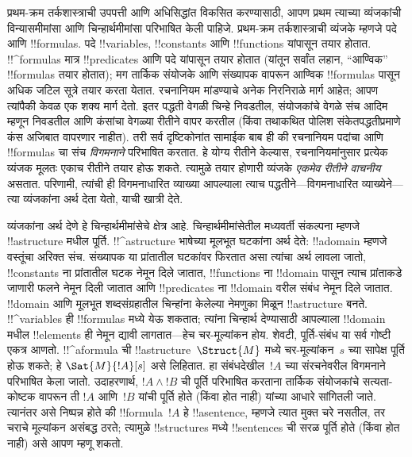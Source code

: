 \documentclass[../../../include/open-logic-section]{subfiles}
\begin{document}


प्रथम-क्रम तर्कशास्त्राची उपपत्ती आणि अधिसिद्धांत विकसित करण्यासाठी,
आपण प्रथम त्याच्या व्यंजकांची विन्यासमीमांसा आणि चिन्हार्थमीमांसा
परिभाषित केली पाहिजे. प्रथम-क्रम तर्कशास्त्राची व्यंजके म्हणजे पदे आणि
!!{formula}s. पदे !!{variable}s, !!{constant}s आणि !!{function}s
यांपासून तयार होतात. !!^{formula}s मात्र !!{predicate}s आणि पदे
यांपासून तयार होतात (यांतून सर्वांत लहान, ``आण्विक'' !!{formula}s
तयार होतात); मग तार्किक संयोजके आणि संख्यापक वापरून आण्विक
!!{formula}s पासून अधिक जटिल सूत्रे तयार करता येतात. रचनानियम
मांडण्याचे अनेक निरनिराळे मार्ग आहेत; आपण त्यांपैकी केवळ एक शक्य
मार्ग देतो. इतर पद्धती वेगळी चिन्हे निवडतील, संयोजकांचे वेगळे संच
आदिम म्हणून निवडतील आणि कंसांचा वेगळ्या रीतीने वापर करतील (किंवा
तथाकथित पोलिश संकेतपद्धतीप्रमाणे कंस अजिबात वापरणार नाहीत). तरी सर्व
दृष्टिकोनांत सामाईक बाब ही की रचनानियम पदांचा आणि !!{formula}s चा
संच \emph{विगमनाने} परिभाषित करतात. हे योग्य रीतीने केल्यास,
रचनानियमांनुसार प्रत्येक व्यंजक मूलतः एकाच रीतीने तयार होऊ शकते.
त्यामुळे तयार होणारी व्यंजके \emph{एकमेव रीतीने वाचनीय} असतात. परिणामी,
त्यांची ही विगमनाधारित व्याख्या आपल्याला त्याच पद्धतीने---विगमनाधारित
व्याख्येने---त्या व्यंजकांना अर्थ देता येतो, याची खात्री देते.

व्यंजकांना अर्थ देणे हे चिन्हार्थमीमांसेचे क्षेत्र आहे. चिन्हार्थमीमांसेतील
मध्यवर्ती संकल्पना म्हणजे !!a{structure} मधील पूर्ति. !!^a{structure}
भाषेच्या मूलभूत घटकांना अर्थ देते: !!a{domain} म्हणजे वस्तूंचा अरिक्त
संच. संख्यापक या प्रांतातील घटकांवर फिरतात असा त्यांचा अर्थ लावला जातो,
!!{constant}s ना प्रांतातील घटक नेमून दिले जातात, !!{function}s ना
!!{domain} पासून त्याच प्रांताकडे जाणारी फलने नेमून दिली जातात आणि
!!{predicate}s ना !!{domain} वरील संबंध नेमून दिले जातात. !!{domain}
आणि मूलभूत शब्दसंग्रहातील चिन्हांना केलेल्या नेमणुका मिळून
!!a{structure} बनते.
!!^{variable}s ही !!{formula}s मध्ये येऊ शकतात; त्यांना चिन्हार्थ देण्यासाठी
आपल्याला !!{domain} मधील !!{element}s ही नेमून द्यावी लागतात---हेच
चर-मूल्यांकन होय. शेवटी, पूर्ति-संबंध या सर्व गोष्टी एकत्र आणतो.
!!^a{formula} ची !!a{structure}~$\Struct{M}$ मध्ये चर-मूल्यांकन~$s$ च्या सापेक्ष पूर्ति होऊ शकते; हे $\Sat{M}{!A}[s]$ असे
लिहितात. हा संबंधदेखील~$!A$ च्या संरचनेवरील विगमनाने परिभाषित केला जातो.
उदाहरणार्थ, $!A \land !B$ ची पूर्ति परिभाषित करताना तार्किक संयोजकांचे
सत्यता-कोष्टक वापरून ती $!A$ आणि~$!B$ यांची पूर्ति होते (किंवा होत नाही)
यांच्या आधारे सांगितली जाते. त्यानंतर असे निष्पन्न होते की !!{formula}~$!A$
हे !!a{sentence}, म्हणजे त्यात मुक्त चरे नसतील, तर चराचे
मूल्यांकन असंबद्ध ठरते; त्यामुळे !!{structure}s मध्ये !!{sentence}s ची
सरळ पूर्ति होते (किंवा होत नाही) असे आपण म्हणू शकतो.
\end{document}
